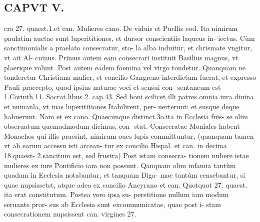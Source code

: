 \documentclass{article}
\begin{document}
\begin{pages}
\section*{CAPVT V. }
\marginpar{[ p.295 ]}\pstart cra 27. quaest.1.et can. Mulieres cano. De viduis et Puellis eod. Ita nimirum paulatim auctae sunt luperititiones, et dursor conscientiis laqueus in- iectus.  \pend\pstart Cùm sanctimonialis a praelato consecratur, sto- la alba induitur, et chrismate vngitur, vt ait Al- cuinus. Primus autem eam consecrari instituit Basilius magnus, vt plaerique volunt. Post autem eadem foemina vel virgo tondetur. Quanquam ne tonderetur Christiana mulier, et concilio Gangreno interdictum fuerat, et expresso Pauli praecepto, quod ipsius naturae voci et sensui con- sentaneum est 1.Corinth.11. Socrat.libus 2. cap.43. Sed boni scilicet illi patres omnia iura diuina et nuinanla, vt iuas luperititiones Itabilirent, per- uerterunt: et susque deque habuerunt. Nam et ex cano. Quaecunque distinct.3o.ita in Ecclesia fuis- se olim obseruatum quemadmodum dicimus, con- stat.  \pend\pstart Consecratae Moniales habent Monachos qui illis praesint, nimirum oues lupis committuntur, (quanquam tamen vt ab earum accessu isti arcean- tur ex concilio Hispal. et can. in decima 18.quaest- 2.sancitum est, sed frustra) Post istam consecra- tionem nubere istae mulieres ex iure Pontificio iam non possunt. Qanquam olim infamia tantùm quadam in Ecclesia notabantur, et tanquam Diga- mae tantùm censebantur, si quae nupsissetst, atque adeo ex concilio Ancyrano et can. Quotquot 27. quaest. ita erat constitutum. Postea vero ipsa su- perstitione nullum iam modum seruante pror- sus ab Ecclesia sunt excommunicatae, quae post i- stam consecrationem nupsissent can. virgines 27.  \pend

\end{pages}
\end{document}
